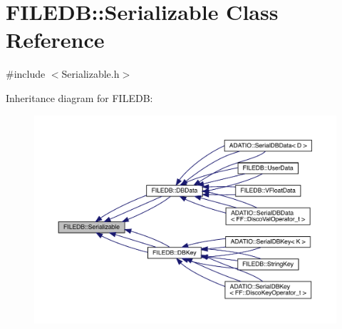 \hypertarget{classFILEDB_1_1Serializable}{}\section{F\+I\+L\+E\+DB\+:\+:Serializable Class Reference}
\label{classFILEDB_1_1Serializable}


{\ttfamily \#include $<$Serializable.\+h$>$}



Inheritance diagram for F\+I\+L\+E\+DB\+:
\nopagebreak
\begin{figure}[H]
\begin{center}
\leavevmode
\includegraphics[width=350pt]{de/dd1/classFILEDB_1_1Serializable__inherit__graph}
\end{center}
\end{figure}
